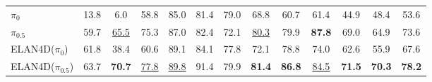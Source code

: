 \begin{table}[H]
{\begin{tabular}{l ccccccc ccccc}
\midrule
$\pi_0$~\citep{black2410pi0}              & 13.8 & 6.0  & 58.8 & 85.0 & 81.4 & 79.0 & 68.8 & 60.7 & 61.4 & 44.9 & 48.4 & 53.6 \\
$\pi_{0.5}$~\citep{black2025pi}          & 59.7 & \underline{65.5} & 75.3 & 87.0 & 82.4 & 72.1 & \underline{80.3} & 79.9 & \textbf{87.8} & 69.0 & 64.9 & 73.6 \\
ELAN4D($\pi_0$)     & 61.8 & 38.4 & 60.6 & 89.1 & 84.1 & 77.8 & 72.1 & 78.8 & 74.0 & 62.6 & 55.9 & 67.6 \\
ELAN4D($\pi_{0.5}$) & 63.7 & \textbf{70.7} & \underline{77.8} & \underline{89.8} & 91.4 & 79.9 & \textbf{81.4} & \textbf{86.8} & \underline{84.5} & \textbf{71.5} & \textbf{70.3} & \textbf{78.2} \\
\bottomrule
\end{tabular}%
}
\end{table}

